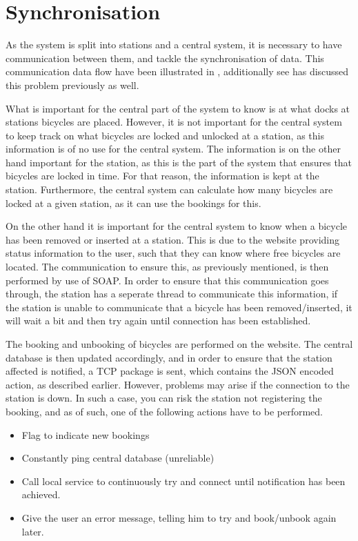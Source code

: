\section{Synchronisation}\label{sec:implsync}
As the system is split into stations and a central system, it is necessary to have communication between them, and tackle the synchronisation of data.
This communication data flow have been illustrated in , additionally see  has discussed this problem previously as well.

\begin{description}[style=nextline]
	\item[Bicycle locking/unlocking not synchronised]
	What is important for the central part of the system to know is at what docks at stations bicycles are placed.
	However, it is not important for the central system to keep track on what bicycles are locked and unlocked at a station, as this information is of no use for the central system.
	The information is on the other hand important for the station, as this is the part of the system that ensures that bicycles are locked in time.
	For that reason, the information is kept at the station. Furthermore, the central system can calculate how many bicycles are locked at a given station, as it can use the bookings for this.
	
	\item[Removal/Insertion of bicycles]
	On the other hand it is important for the central system to know when a bicycle has been removed or inserted at a station.
	This is due to the website providing status information to the user, such that they can know where free bicycles are located.
	The communication to ensure this, as previously mentioned, is then performed by use of SOAP.
	In order to ensure that this communication goes through, the station has a seperate thread to communicate this information, if the station is unable to communicate that a bicycle has been removed/inserted, it will wait a bit and then try again until connection has been established.
	
	\item[Booking/Unbooking]
	The booking and unbooking of bicycles are performed on the website. 
	The central database is then updated accordingly, and in order to ensure that the station affected is notified, a TCP package is sent, which contains the JSON encoded action, as described earlier.
	However, problems may arise if the connection to the station is down.
	In such a case, you can risk the station not registering the booking, and as of such, one of the following actions have to be performed.
	\begin{itemize}
		\item Flag to indicate new bookings
		\item Constantly ping central database (unreliable)
		\item Call local service to continuously try and connect until notification has been achieved.
		\item Give the user an error message, telling him to try and book/unbook again later. 
	\end{itemize}
	

\end{description}
